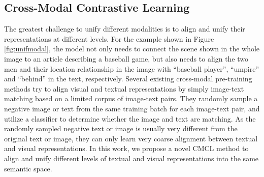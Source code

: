 \documentclass[11pt,a4paper]{article}
\begin{document}
\subsection{Cross-Modal Contrastive Learning}
\label{ssec:cmcl}

The greatest challenge to unify different modalities is to align and unify their representations at different levels.
For the example shown in Figure \ref{fig:unifmodal}, the model not only needs to connect the scene shown in the whole image to an article describing a baseball game, but also needs to align the two men and their location relationship in the image with ``baseball player'', ``umpire'' and ``behind'' in the text, respectively.
Several existing cross-modal pre-training methods try to align visual and textual representations by simply image-text matching \citep{li2019unicoder, chen2020uniter} based on a limited corpus of image-text pairs.
They randomly sample a negative image or text from the same training batch for each image-text pair, and utilize a classifier to determine whether the image and text are matching.
As the randomly sampled negative text or image is usually very different from the original text or image, they can only learn very coarse alignment between textual and visual representations.
In this work, we propose a novel CMCL method to align and unify different levels of textual and visual representations into the same semantic space.
\end{document}
